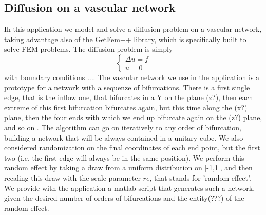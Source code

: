 \documentclass[11pt]{article} %
\begin{document}
	\subsection{Diffusion on a vascular network}
	Ih this application we model and solve a diffusion problem on a vascular network, taking advantage also of the GetFem++ library, which is specifically built to solve FEM problems. \newline
	The diffusion problem is simply
	\begin{equation*}
		\left\{
		\begin{aligned}
		\Delta u = f \\
		u = 0 
		\end{aligned}
		\right.
	\end{equation*}
	with boundary conditions .... 	\newline
	The vascular network we use in the application is a prototype for a network with a sequenze of bifurcations. There is a first single edge, that is the inflow one, that bifurcates in a Y on the plane (z?), then each extreme of this first bifurcation bifurcates again, but this time along the (x?) plane, then the four ends with which we end up bifurcate again on the (z?) plane, and so on . The algorithm can go on iteratively to any order of bifurcation, building a network that will be always contained in a unitary cube. We also considered randomization on the final coordinates of each end point, but the first two (i.e. the first edge will always be in the same position). We perform this random effect by taking a draw from a uniform distribution on [-1,1], and then recaling this draw with the scale parameter $re$, that stands for 'random effect'. We provide with the application a matlab script that generates such a network, given the desired number of orders of bifurcations and the entity(???) of the random effect.
		
\end{document}
